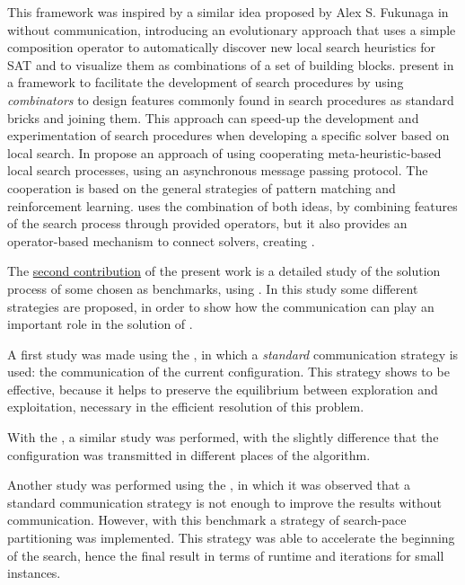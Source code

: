 This framework was inspired by a similar idea proposed by Alex S. Fukunaga in \cite{Fukunaga2008} without communication, introducing an evolutionary approach that uses a simple composition operator to automatically discover new local search heuristics for SAT and to  visualize them as combinations of a set of building blocks.  present in \cite{Landtsheer2015} a framework to facilitate the development of search procedures by using \textit{combinators} to design features commonly found in search procedures as standard bricks and joining them. This approach can speed-up the development and experimentation of search procedures when developing a specific solver based on local search. In \cite{Martin2016}  propose an approach of using cooperating meta-heuristic-based local search processes, using an asynchronous message passing protocol. The cooperation is based on the general strategies of pattern matching and reinforcement learning. \posl{} uses the combination of both ideas, by combining features of the search process through provided operators, but it also provides an operator-based mechanism to connect solvers, creating \comstrs.


The \underline{second contribution} of the present work is a detailed study of the solution process of some \CSPs{} chosen as benchmarks, using \posl{}. In this study some different strategies are proposed, in order to show how the communication can play an important role in the solution of \csps{}.

A first study was made using the \sgp{}, in which a \textit{standard} communication strategy is used: the communication of the current configuration. This strategy shows to be effective, because it helps to preserve the equilibrium between exploration and exploitation, necessary in the efficient resolution of this problem.

With the \carrp{}, a similar study was performed, with the slightly difference that the configuration was transmitted in different places of the algorithm.

Another study was performed using the \nqp{}, in which it was observed that a standard communication strategy is not enough to improve the results without communication. However, with this benchmark a strategy of search-pace partitioning was implemented. This strategy was able to accelerate the beginning of the search, hence the final result in terms of runtime and iterations for small instances.

